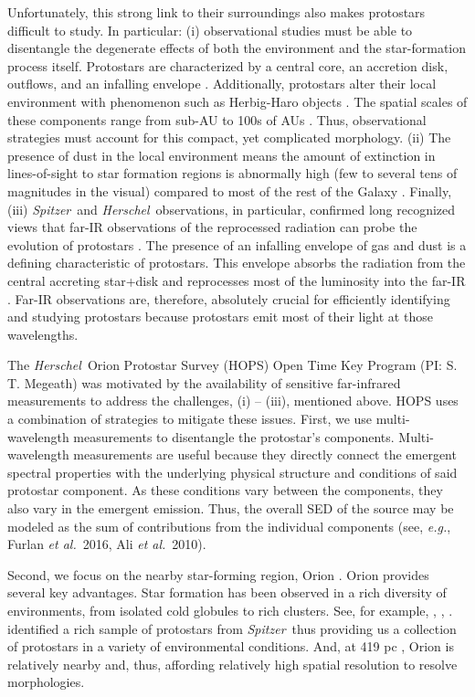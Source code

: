 \documentclass[manuscript]{aastex61}
\newcommand{\etal}{{\em et al.}}
\newcommand{\eg}{{\em e.g.}}
\newcommand{\herschel}{{\em Herschel}}
\newcommand{\spitzer}{{\em Spitzer}}
\begin{document}
Unfortunately, this strong link to their surroundings also makes protostars difficult to study.  In particular:  (i) observational studies must be able to disentangle the degenerate effects of both the environment and the star-formation process itself.  Protostars are characterized by a central core, an accretion disk, outflows, and an infalling envelope \citep{ali}. Additionally, protostars alter their local environment with phenomenon such as Herbig-Haro objects \citep{hhobjects}.  The spatial scales of these components range from sub-AU to 100s of AUs \citep{mo07}.  Thus, observational strategies must account for this compact, yet complicated morphology.  (ii) The presence of dust in the local environment means the amount of extinction in lines-of-sight to star formation regions is abnormally high (few to several tens of magnitudes in the visual) compared to most of the rest of the Galaxy \citep{dobbs}.  Finally, (iii)  \spitzer\ and \herschel\ observations, in particular, confirmed long recognized views that far-IR observations of the reprocessed radiation can probe the evolution of protostars \citep{als87}.  The presence of an infalling envelope of gas and dust is a defining characteristic of protostars. This envelope absorbs the radiation from the central accreting star+disk and reprocesses most of the luminosity into the far-IR \citep{ali}.   Far-IR observations are, therefore, absolutely crucial for efficiently identifying and studying protostars because protostars emit most of their light at those wavelengths.
\par
The  \herschel\ Orion Protostar Survey (HOPS) Open Time Key Program (PI: S. T. Megeath) was motivated by the availability of sensitive far-infrared measurements to address the challenges, (i) -- (iii), mentioned above.  HOPS uses a combination of strategies to mitigate these issues.  First, we use multi-wavelength measurements to disentangle the protostar's components.  Multi-wavelength measurements are useful because they directly connect the emergent spectral properties with the underlying physical structure and conditions of said protostar component.  As these conditions vary between the components, they also vary in the emergent emission.  Thus, the overall SED of the source may be modeled as the sum of contributions from the individual components (see, \eg, Furlan \etal\ 2016, Ali \etal\ 2010).
\par
Second, we focus on the nearby star-forming region, Orion \citep{orion}.  Orion provides several key advantages.  Star formation has been observed in a rich diversity of environments, from isolated cold globules to rich clusters. See, for example, \cite{carpenter}, \cite{feigelson}, \cite{amy2010}.   \cite{orion} identified a rich sample of protostars from \spitzer\ thus providing us a collection of protostars in a variety of environmental conditions.  And, at 419 pc \citep{schlafly} , Orion is relatively nearby and, thus, affording relatively high spatial resolution to resolve morphologies.
\end{document}
